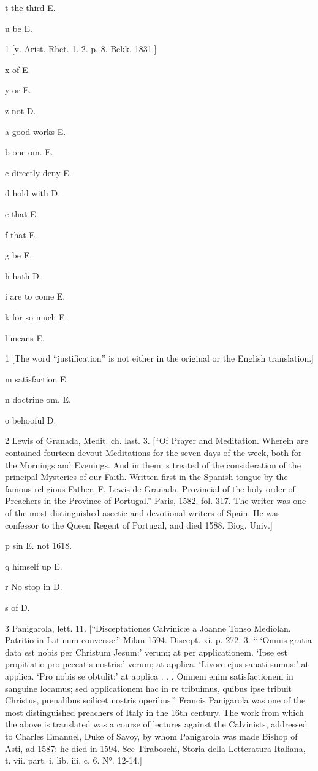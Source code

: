 t
the third E.

u
be E.

1
[v. Arist. Rhet. 1. 2. p. 8. Bekk. 1831.]

x
of E.

y
or E.

z
not D.

a
good works E.

b
one om. E.

c
directly deny E.

d
hold with D.

e
that E.

f
that E.

g
be E.

h
hath D.

i
are to come E.

k
for so much E.

l
means E.

1
[The word “justification” is not either in the original or the English translation.]

m
satisfaction E.

n
doctrine om. E.

o
behooful D.

2
Lewis of Granada, Medit. ch. last. 3. [“Of Prayer and Meditation. Wherein are contained fourteen devout Meditations for the seven days of the week, both for the Mornings and Evenings. And in them is treated of the consideration of the principal Mysteries of our Faith. Written first in the Spanish tongue by the famous religious Father, F. Lewis de Granada, Provincial of the holy order of Preachers in the Province of Portugal.” Paris, 1582. fol. 317. The writer was one of the most distinguished ascetic and devotional writers of Spain. He was confessor to the Queen Regent of Portugal, and died 1588. Biog. Univ.]

p
sin E. not 1618.

q
himself up E.

r
No stop in D.

s
of D.

3
Panigarola, lett. 11. [“Disceptationes Calvinicæ a Joanne Tonso Mediolan. Patritio in Latinum conversæ.” Milan 1594. Discept. xi. p. 272, 3. “ ‘Omnis gratia data est nobis per Christum Jesum:’ verum; at per applicationem. ‘Ipse est propitiatio pro peccatis nostris:’ verum; at applica. ‘Livore ejus sanati sumus:’ at applica. ‘Pro nobis se obtulit:’ at applica . . . Omnem enim satisfactionem in sanguine locamus; sed applicationem hac in re tribuimus, quibus ipse tribuit Christus, pœnalibus scilicet nostris operibus.” Francis Panigarola was one of the most distinguished preachers of Italy in the 16th century. The work from which the above is translated was a course of lectures against the Calvinists, addressed to Charles Emanuel, Duke of Savoy, by whom Panigarola was made Bishop of Asti, ad 1587: he died in 1594. See Tiraboschi, Storia della Letteratura Italiana, t. vii. part. i. lib. iii. c. 6. N°. 12-14.]

